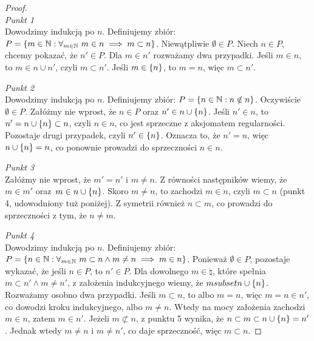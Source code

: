 \begin{proof}
    \textit{\\Punkt 1}\\
    Dowodzimy indukcją po \( n \). Definiujemy zbiór: \( P = \set{m \in \natural : \forall_{m \in \natural} \ m \in n \implies m \subset n} \). Niewątpliwie \( \emptyset \in P \). Niech \( n \in P \), chcemy pokazać, że \( n' \in P \).
    Dla \( m \in n' \) rozważamy dwa przypadki. Jeśli \( m \in n \), to \( m \in n \cup n' \), czyli \( m \subset n' \). Jeśli \( m \in \set{n} \), to \( m = n \), więc \( m \subset n' \).
    
    \textit{Punkt 2}\\
    Dowodzimy indukcją po \( n \). Definiujemy zbiór: \( P = \set{n \in \natural : n \notin n} \). Oczywiście \( \emptyset \in P \). Załóżmy nie wprost, że \( n \in P \) oraz \( n' \in n \cup \set{n} \).
    Jeśli \( n' \in n \), to \( n' = n \cup \set{n} \subset n \), czyli \( n \in n \), co jest sprzeczne z aksjomatem regularności. Pozostaje drugi przypadek, czyli \( n' \in \set{n} \). Oznacza to, że \( n' = n \), więc \( n \cup \set{n}  = n \), co ponownie prowadzi do sprzeczności \( n \in n \).

    \textit{Punkt 3}\\
    Załóżmy nie wprost, że \( m' = n' \) i \( m \ne n \). Z równości następników wiemy, że \( m \in m' \) oraz~\( m \in n \cup \set{n} \).
    Skoro \( m \ne n \), to zachodzi \( m \in n \), czyli \( m \subset n \) (punkt 4, udowodniony tuż poniżej). Z symetrii również \( n \subset m \), co prowadzi do sprzeczności z tym, że \( n \ne m \).

    \textit{Punkt 4}\\
    Dowodzimy indukcją po \( n \). Definiujemy zbiór: \( P = \set{n \in \natural : \forall_{m \in \natural} \ m \subset n \land m \ne n \implies m \in n} \). Ponieważ \( \emptyset \in P \), pozostaje wykazać, że jeśli \( n \in P \), to \( n' \in P \).
    Dla dowolnego \( m \in \natural \), które spełnia \( m \subset n' \land m \ne n' \), z założenia indukcyjnego wiemy, że \( msubset n \cup \set{n} \).
    Rozważamy osobno dwa przypadki. Jeśli \( m \subset n \), to albo \( m = n \), więc \( m = n \in n' \), co dowodzi kroku indukcyjnego, albo \( m \ne n \). Wtedy na mocy założenia zachodzi \( m \in n \), zatem  \( m \in n' \).
    Jeżeli \( m \not\subset n \), z punktu 5 wynika, że \( n \subset m \subset n \cup \set{n} = n' \). Jednak wtedy \( m \ne n \) i \( m \ne n' \), co daje sprzeczność, więc \( m \subset n \).


\end{proof}
